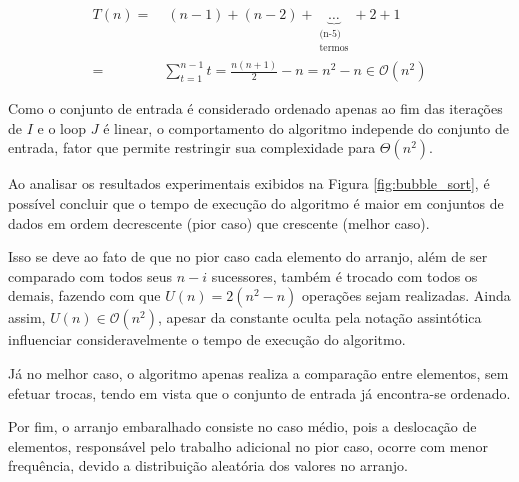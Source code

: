 \documentclass[12pt]{article}
\begin{document}
\begin{equation}
\label{eq:soma_quadratica}
\begin{aligned}
    T(n) = &\; (n-1)+(n-2)+\underbrace{\ldots}_{\substack{\text{(n-5)} \\ \text{termos}}}+2+1 \\
         = & \sum_{t=1}^{n-1}t = \frac{n(n+1)}{2} - n = n^2-n  \in \mathcal{O}(n^2)
\end{aligned}
\end{equation}

Como o conjunto de entrada é considerado ordenado apenas ao fim das iterações de $I$ e o loop $J$ é linear, o comportamento do algoritmo independe do conjunto de entrada, fator que permite restringir sua complexidade para $\Theta(n^2)$.

Ao analisar os resultados experimentais exibidos na Figura \ref{fig:bubble_sort}, é possível concluir que o tempo de execução do algoritmo é maior em conjuntos de dados em ordem decrescente (pior caso) que crescente (melhor caso).

Isso se deve ao fato de que no pior caso cada elemento do arranjo, além de ser comparado com todos seus $n-i$ sucessores, também é trocado com todos os demais, fazendo com que $U(n) = 2(n^2-n)$ operações sejam realizadas. Ainda assim, $U(n) \in \mathcal{O}(n^2)$, apesar da constante oculta pela notação assintótica influenciar consideravelmente o tempo de execução do algoritmo.

Já no melhor caso, o algoritmo apenas realiza a comparação entre elementos, sem efetuar trocas, tendo em vista que o conjunto de entrada já encontra-se ordenado.

Por fim, o arranjo embaralhado consiste no caso médio, pois a deslocação de elementos, responsável pelo trabalho adicional no pior caso, ocorre com menor frequência, devido a distribuição aleatória dos valores no arranjo.
\end{document}
